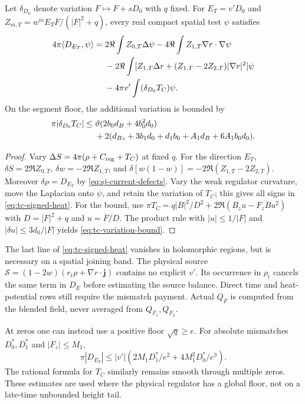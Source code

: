 \begin{proposition}
\label{prop:tc-variation}
Let $\delta_{D_0}$ denote variation $F\mapsto F+sD_0$ with $q$ fixed.
For $E_T=v'D_0$ and
$Z_{m,T}=w^mE_T\overline F/(|F|^2+q)$, every real compact spatial
test $\psi$ satisfies
\begin{align}
 4\pi\langle D_{E_T},\psi\rangle={}&
 2\Re\int Z_{0,T}\Delta\psi
 -4\Re\int Z_{1,T}\nabla r\cdot\nabla\psi\notag\\
 &-2\Re\int[Z_{1,T}\Delta r
              +(Z_{1,T}-2Z_{2,T})|\nabla r|^2]\psi\notag\\
 &-4\pi v'\int(\delta_{D_0}T_C)\psi.
 \label{eq:tc-signed-heat}
\end{align}
On the segment floor, the additional variation is bounded by
\begin{align}
 \pi|\delta_{D_0}T_C|\le{}&
 \vartheta(2b_0d_B+4b_0^2d_0)\notag\\
 &+2(d_{Bz}+3b_1d_0+d_1b_0+A_1d_B+6A_1b_0d_0).
 \label{eq:tc-variation-bound}
\end{align}
\end{proposition}
\begin{proof}
Vary $\Delta S=4\pi(\rho+C_{\rm reg}+T_C)$ at fixed $q$.
For the direction $E_T$, $\delta S=2\Re Z_{0,T}$,
$\delta w=-2\Re Z_{1,T}$, and
$\delta[w(1-w)]=-2\Re(Z_{1,T}-2Z_{2,T})$.
Moreover $\delta\rho=D_{E_T}$ by
\eqref{eq:sj-current-defects}. Vary the weak regulator curvature,
move the Laplacian onto $\psi$, and retain the variation of $T_C$;
this gives all signs in \eqref{eq:tc-signed-heat}.
For the bound, use
$\pi T_C=q|B|^2/D^2+2\Re(B_z u-F_zBu^2)$ with
$D=|F|^2+q$ and $u=\overline F/D$.
The product rule with $|u|\le1/|F|$ and
$|\delta u|\le3d_0/|F|$ yields
\eqref{eq:tc-variation-bound}.
\end{proof}
The last line of \eqref{eq:tc-signed-heat} vanishes in holomorphic
regions, but is necessary on a spatial joining band. The physical source
$\mathcal S=(1-2w)(r_t\rho+\nabla r\cdot\mathbf j)$ contains no
explicit $v'$. Its occurrence in $\rho_t$ cancels the same term in
$D_E$ before estimating the source balance. Direct time and heat-potential
rows still require the mismatch payment. Actual $Q_F$ is computed from
the blended field, never averaged from $Q_{F_1},Q_{F_2}$.

At zeros one can instead use a positive floor $\sqrt q\ge e$.
For absolute mismatches $D_0^*,D_1^*$ and $|F_z|\le M_1$,
\begin{equation}
 \pi|D_{E_T}|\le|v'|
       (2M_1D_1^*/e^2+4M_1^2D_0^*/e^3).
 \label{eq:tc-floor-heat}
\end{equation}
The rational formula for $T_C$ similarly remains smooth through multiple
zeros. These estimates are used where the physical regulator has a
global floor, not on a late-time unbounded height tail.

